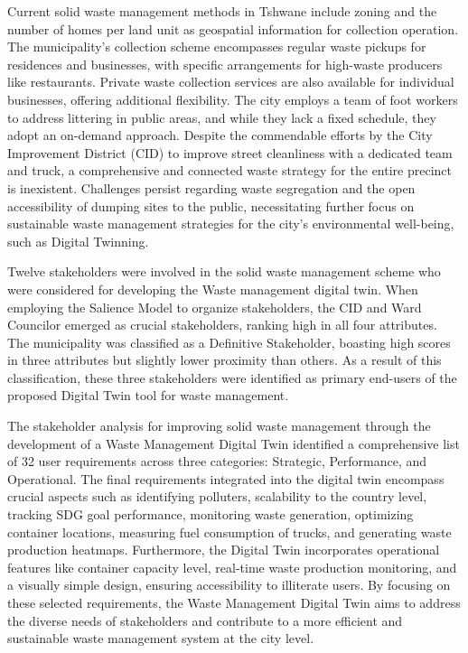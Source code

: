 \documentclass[authoryear,preprint,review,12pt]{elsarticle}
\begin{document}
    Current solid waste management methods in Tshwane include zoning and the number of homes per land unit as geospatial information for collection operation. The municipality's collection scheme encompasses regular waste pickups for residences and businesses, with specific arrangements for high-waste producers like restaurants. Private waste collection services are also available for individual businesses, offering additional flexibility. The city employs a team of foot workers to address littering in public areas, and while they lack a fixed schedule, they adopt an on-demand approach. Despite the commendable efforts by the City Improvement District (CID) to improve street cleanliness with a dedicated team and truck, a comprehensive and connected waste strategy for the entire precinct is inexistent. Challenges persist regarding waste segregation and the open accessibility of dumping sites to the public, necessitating further focus on sustainable waste management strategies for the city's environmental well-being, such as Digital Twinning.

    Twelve stakeholders were involved in the solid waste management scheme who were considered for developing the Waste management digital twin. When employing the Salience Model to organize stakeholders, the CID and Ward Councilor emerged as crucial stakeholders, ranking high in all four attributes. The municipality was classified as a Definitive Stakeholder, boasting high scores in three attributes but slightly lower proximity than others. As a result of this classification, these three stakeholders were identified as primary end-users of the proposed Digital Twin tool for waste management.

    The stakeholder analysis for improving solid waste management through the development of a Waste Management Digital Twin identified a comprehensive list of 32 user requirements across three categories: Strategic, Performance, and Operational. The final requirements integrated into the digital twin encompass crucial aspects such as identifying polluters, scalability to the country level, tracking SDG goal performance, monitoring waste generation, optimizing container locations, measuring fuel consumption of trucks, and generating waste production heatmaps. Furthermore, the Digital Twin incorporates operational features like container capacity level, real-time waste production monitoring, and a visually simple design, ensuring accessibility to illiterate users. By focusing on these selected requirements, the Waste Management Digital Twin aims to address the diverse needs of stakeholders and contribute to a more efficient and sustainable waste management system at the city level.
\end{document}
